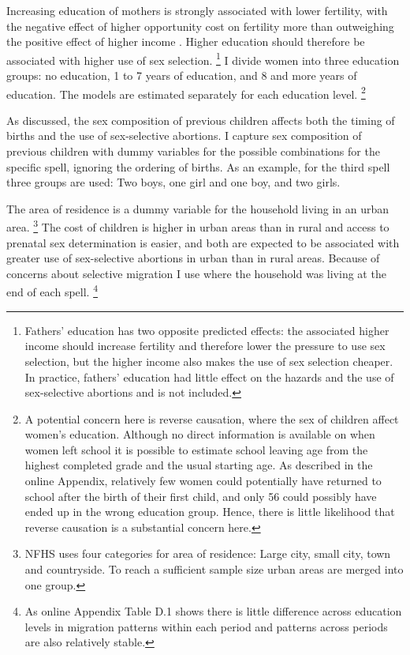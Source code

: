 \documentclass[12pt,letterpaper]{article}
\begin{document}
Increasing education of mothers is strongly associated with lower fertility, with
the negative effect of higher opportunity cost on fertility more than outweighing the 
positive effect of higher income \citep{schultz97}.
Higher education should therefore be associated with higher use of sex selection.%
\footnote{
Fathers' education has two opposite predicted effects: the associated higher income
should increase fertility and therefore lower the pressure to use sex selection, but
the higher income also makes the use of sex selection cheaper.
In practice, fathers' education had little effect on the hazards and the use of 
sex-selective abortions and is not included.
}
I divide women into three education groups:
no education, 1 to 7 years of education, and 8 and more years of education.
The models are estimated separately for each education level.%
\footnote{
A potential concern here is reverse causation, where the sex of children
affect women's education.
Although no direct information is available on when women left school it is
possible to estimate school leaving age from the highest completed grade
and the usual starting age.
As described in the online Appendix, relatively few women could potentially 
have returned to school after the birth of their first child,
and only 56 could possibly have ended up in the wrong education group. 
Hence, there is little likelihood that reverse causation is a substantial
concern here.
}

As discussed, the sex composition of previous children affects both the timing
of births and the use of sex-selective abortions.
I capture sex composition of previous children with dummy variables for the
possible combinations for the specific spell, ignoring the ordering of births.
As an example, for the third spell three groups are used: Two boys,
one girl and one boy, and two girls.

The area of residence is a dummy variable for the household living in
an urban area.%
\footnote{
NFHS uses four categories for area of residence: Large city, small city, town
and countryside.
To reach a sufficient sample size urban areas are merged into one group.
}
The cost of children is higher in urban areas than in rural and access to prenatal
sex determination is easier, and both are expected to be associated with
greater use of sex-selective abortions in urban than in rural areas.
Because of concerns about selective migration I use where the household was living
at the end of each spell.%
\footnote{
As online Appendix Table D.1 shows there is little difference across
education levels in migration patterns within each period and patterns across periods
are also relatively stable.
}
\end{document}
